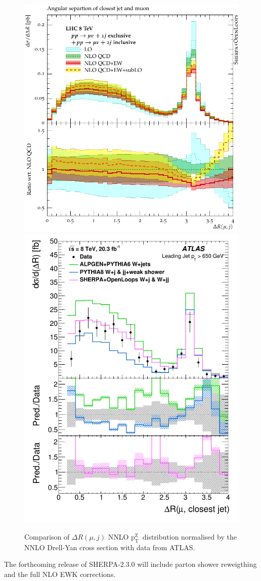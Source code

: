 \documentclass[a4paper,11pt,notoc]{article}
\newcommand{\ptZ}{\ensuremath{\mathrm{p_T^{Z}}}}
\begin{document}
\begin{figure}[t!]
\centering
\includegraphics[width=0.495\columnwidth]{WinJet_dR_mu_jet_1jex2jin.pdf} 
\includegraphics[width=0.495\columnwidth]{fig_05b.pdf} 
\caption{Comparison of $\Delta R (\mu,j)$  NNLO \ptZ\ distribution normalised by the NNLO Drell-Yan cross section with data from ATLAS.}
\label{fig:WinJet}
\end{figure}   

The forthcoming release of SHERPA-2.3.0 will include parton shower reweigthing and the full NLO EWK corrections.
\end{document}
